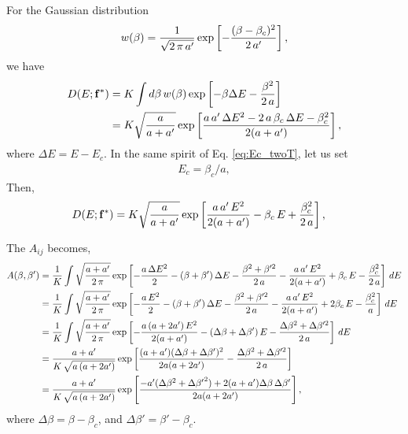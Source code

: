 \documentclass[aip,jcp,preprint,notitlepage, superscriptaddress]{revtex4-1}
\begin{document}
For the Gaussian distribution
\begin{align}
w(\beta)
=
\frac{1}{\sqrt{2 \, \pi \, a'}}
\exp\left[
  -\frac{ (\beta - \beta_c)^2 }{ 2 \, a' }
\right],
\notag
\end{align}
%
we have
%
\begin{align*}
D(E; \mathbf{f}^*)
&=
K \int d\beta \, w(\beta)
\exp\left[
  -\beta \Delta E -\frac{ \beta^2 }{ 2 \, a}
\right]
\\
&=
K \sqrt{\frac{a}{a+a'}}
\exp\left[
\frac{
  a \, a' \, \Delta E^2
  - 2 \, a \, \beta_c \, \Delta E
  - \beta_c^2
}
{
  2 (a + a')
}
\right],
\end{align*}
where $\Delta E = E - E_c$.
%
In the same spirit of Eq. \eqref{eq:Ec_twoT},
let us set
\begin{align}
E_c = \beta_c / a,
\label{eq:Ec_cont}
\end{align}
%
Then,
\begin{align*}
D(E; \mathbf{f}^*)
&=
K \sqrt{\frac{a}{a+a'}}
\exp\left[
\frac{
  a \, a' \, E^2
}
{
  2 (a + a')
}
-\beta_c \, E
+
\frac{\beta_c^2}{2 \, a}
\right],
\end{align*}


The $A_{ij}$ becomes,
%
%
%
\begin{align*}
A(\beta, \beta')
&=
\frac 1 K
\int
\sqrt \frac { a + a' } { 2 \, \pi }
\exp\left[
-\frac{ a \, \Delta E^2 } { 2 }
-(\beta + \beta') \, \Delta E
-
\frac{
  \beta^2 + \beta'^2
} { 2 \, a}
-
\frac{
  a \, a' \, E^2
}
{
  2 (a + a')
}
+\beta_c \, E
-
\frac{\beta_c^2}{2 \, a}
\right]
\, dE
\notag \\
%
%
%
&=
\frac 1 K
\int
\sqrt \frac { a + a' } { 2 \, \pi }
\exp\left[
-\frac{
  a \, E^2
}
{
  2
}
-(\beta + \beta') \, \Delta E
-
\frac{
  \beta^2 + \beta'^2
} { 2 \, a}
-
\frac{
  a \, a' \, E^2
}
{
  2 (a + a')
}
+2\beta_c \, E
-
\frac{\beta_c^2}{a}
\right]
\, dE
\notag \\
%
%
%
&=
\frac 1 K
\int
\sqrt \frac { a + a' } { 2 \, \pi }
\exp\left[
-\frac{
  a \, (a + 2a') \, E^2
}
{
  2 (a + a')
}
-(\Delta \beta + \Delta \beta') \, E
-
\frac{
  \Delta \beta^2 + \Delta \beta'^2
} { 2 \, a}
\right]
\, dE
\notag \\
%
%
%
&=
\frac{ a + a' } { K \, \sqrt{ a \, (a + 2 a')} }
\exp\left[
  \frac{
    (a+a') (\Delta \beta + \Delta \beta')^2
  }
  {
    2 a (a + 2 a')
  }
  -
  \frac{
    \Delta \beta^2 + \Delta \beta'^2
  } { 2 \, a}
\right]
\notag\\
%
%
%
&=
\frac{ a + a' } { K \, \sqrt{a \, ( a + 2 a') } }
\exp\left[
  \frac{
    -a' (\Delta \beta^2 + \Delta {\beta'}^2)
    +2(a+a') \Delta \beta \, \Delta \beta'
  }
  {
    2 a (a + 2 a')
  }
\right],
\end{align*}
where
$\Delta \beta = \beta - \beta_c$,
and
$\Delta \beta' = \beta' - \beta_c$.
\end{document}
